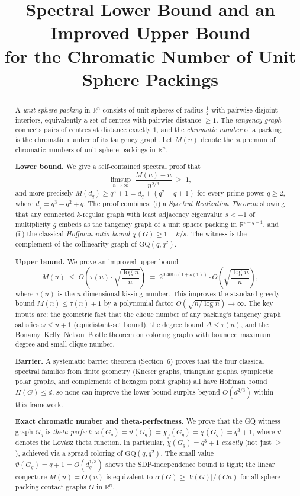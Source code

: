 \documentclass{article}
\title{Spectral Lower Bound and an Improved Upper Bound\\ for the Chromatic Number of Unit Sphere Packings}
\date{}
\theoremstyle{definition}
\begin{document}
\maketitle

\begin{abstract}
A \emph{unit sphere packing} in $\mathbb{R}^n$ consists of unit spheres of radius $\tfrac12$ with pairwise disjoint interiors, equivalently a set of centres with pairwise distance $\ge 1$.  The \emph{tangency graph} connects pairs of centres at distance exactly $1$, and the \emph{chromatic number} of a packing is the chromatic number of its tangency graph.  Let $M(n)$ denote the supremum of chromatic numbers of unit sphere packings in $\mathbb{R}^n$.

\textbf{Lower bound.}  We give a self-contained spectral proof that
\[
  \limsup_{n\to\infty}\;\frac{M(n)-n}{n^{2/3}}\;\ge\;1,
\]
and more precisely $M(d_q)\ge q^3+1 = d_q+(q^2-q+1)$ for every prime power $q\ge 2$, where $d_q=q^3-q^2+q$.  The proof combines: (i) a \emph{Spectral Realization Theorem} showing that any connected $k$-regular graph with least adjacency eigenvalue $s<-1$ of multiplicity $g$ embeds as the tangency graph of a unit sphere packing in $\mathbb{R}^{v-g-1}$, and (ii) the classical \emph{Hoffman ratio bound} $\chi(G)\ge 1-k/s$.  The witness is the complement of the collinearity graph of $\mathrm{GQ}(q,q^2)$.

\textbf{Upper bound.}  We prove an improved upper bound
\[
  M(n)\;\le\; O\!\left(\tau(n)\cdot\sqrt{\frac{\log n}{n}}\right)
  \;=\;2^{0.401n(1+o(1))}\cdot O\!\left(\sqrt{\frac{\log n}{n}}\right),
\]
where $\tau(n)$ is the $n$-dimensional kissing number.  This improves the standard greedy bound $M(n)\le\tau(n)+1$ by a polynomial factor $O(\sqrt{n/\log n})\to\infty$.  The key inputs are: the geometric fact that the clique number of any packing's tangency graph satisfies $\omega\le n+1$ (equidistant-set bound), the degree bound $\Delta\le\tau(n)$, and the Bonamy--Kelly--Nelson--Postle theorem on coloring graphs with bounded maximum degree and small clique number.

\textbf{Barrier.}  A systematic barrier theorem (Section~6) proves that the four classical spectral families from finite geometry (Kneser graphs, triangular graphs, symplectic polar graphs, and complements of hexagon point graphs) all have Hoffman bound $H(G)\le d$, so none can improve the lower-bound surplus beyond $O(d^{2/3})$ within this framework.

\textbf{Exact chromatic number and theta-perfectness.}  We prove that the GQ witness graph $G_q$ is \emph{theta-perfect}: $\omega(G_q)=\vartheta(\overline{G_q})=\chi_f(G_q)=\chi(G_q)=q^3+1$, where $\vartheta$ denotes the Lov\'asz theta function.  In particular, $\chi(G_q)=q^3+1$ \emph{exactly} (not just $\ge$), achieved via a spread coloring of $\mathrm{GQ}(q,q^2)$.  The small value $\vartheta(G_q)=q+1=O(d_q^{1/3})$ shows the SDP-independence bound is tight; the linear conjecture $M(n)=O(n)$ is equivalent to $\alpha(G)\ge |V(G)|/(Cn)$ for all sphere packing contact graphs $G$ in $\mathbb{R}^n$.
\end{abstract}
\end{document}
